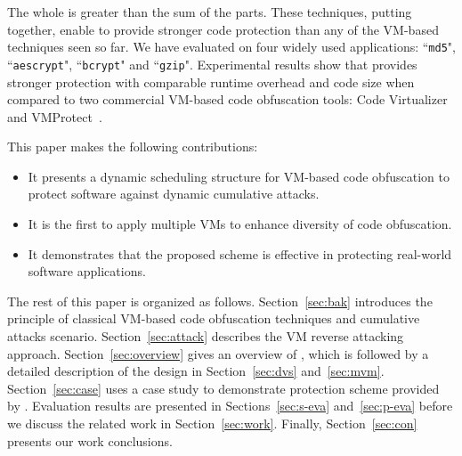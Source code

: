 The whole is greater than the sum of the parts. These techniques, putting together,
enable \DSVMP to provide stronger code protection than any of the VM-based techniques seen so far.
We have evaluated \DSVMP on four widely used applications:  ``\texttt{md5}", ``\texttt{aescrypt}", ``\texttt{bcrypt}" and ``\texttt{gzip}". Experimental results show that \DSVMP provides stronger protection with comparable runtime overhead and code size
when compared to two commercial VM-based code obfuscation tools: Code Virtualizer~\cite{2CV} and VMProtect~\cite{3Vmprotect}.


This paper makes the following contributions:
\begin{itemize}
  \item It presents a dynamic scheduling structure for VM-based code obfuscation to protect software against dynamic cumulative attacks.
  \item It is the first to apply multiple VMs to enhance diversity of code obfuscation.
  \item It demonstrates that the proposed scheme is effective in protecting real-world software applications.
\end{itemize}

The rest of this paper is organized as follows.
Section~\ref{sec:bak} introduces the principle of classical VM-based
code obfuscation techniques and cumulative attacks scenario.
Section~\ref{sec:attack} describes the VM reverse attacking approach.
Section~\ref{sec:overview} gives an overview of \DSVMP,
which is followed by a detailed description of the design in Section~\ref{sec:dvs} and~\ref{sec:mvm}.
Section~\ref{sec:case} uses a case study to demonstrate protection scheme provided by \DSVMP.
Evaluation results are presented in Sections~\ref{sec:s-eva} and~\ref{sec:p-eva} before we discuss the related work
in Section~\ref{sec:work}. Finally, Section~\ref{sec:con} presents our work conclusions. 